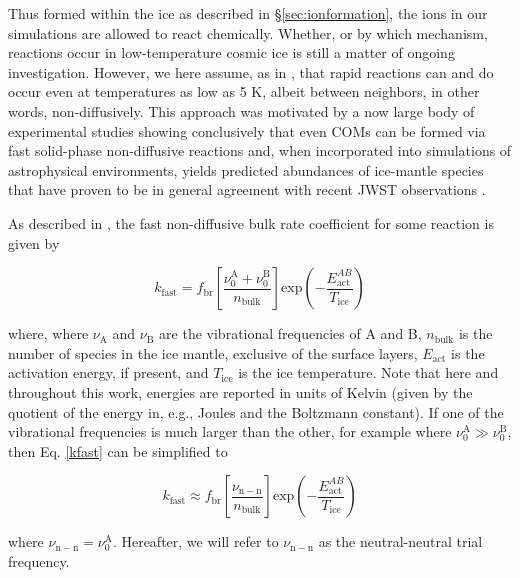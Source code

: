\documentclass[journal=aesccq,manuscript=draft]{achemso}
\begin{document}
Thus formed within the ice as described in \S\ref{sec:ionformation}, the ions in our simulations are allowed to react chemically. Whether, or by which mechanism, reactions occur in low-temperature cosmic ice is still a matter of ongoing investigation. However, we here assume, as in \citet{shingledecker_simulating_2019}, that rapid reactions can and do occur even at temperatures as low as 5 K, albeit between neighbors, in other words, non-diffusively. This approach was motivated by a now large body of experimental studies showing conclusively that even COMs can be formed via fast solid-phase non-diffusive reactions \citep{abplanalp_study_2016,doddipatla_low-temperature_2021,bergantini_combined_2018,fedoseev_hydrogenation_2022} and, when incorporated into simulations of astrophysical environments, yields predicted abundances of ice-mantle species that have proven to be in general agreement with recent JWST observations \citep{shingledecker_efficient_2020,mcclure_ice_2023,yang_corinos_2022}. 

As described in \citet{shingledecker_simulating_2019}, the fast non-diffusive bulk rate coefficient for some reaction  is given by

\begin{equation}
    k_\mathrm{fast} = f_\mathrm{br}\left[\frac{\nu_0^\mathrm{A} + \nu_0^\mathrm{B}}{n_\mathrm{bulk}} \right] \mathrm{exp}\left( - \frac{E_\mathrm{act}^{AB}}{T_\mathrm{ice}}\right)
    \label{kfast}
\end{equation}

\noindent
where, where $\nu_\mathrm{A}$ and $\nu_\mathrm{B}$ are the vibrational frequencies of A and B, $n_\mathrm{bulk}$ is the number of species in the ice mantle, exclusive of the surface layers, $E_\mathrm{act}$ is the activation energy, if present, and $T_\mathrm{ice}$ is the ice temperature. Note that here and throughout this work, energies are reported in units of Kelvin (given by the quotient of the energy in, e.g., Joules and the Boltzmann constant). If one of the vibrational frequencies is much larger than the other, for example where $\nu_0^\mathrm{A} \gg \nu_0^\mathrm{B}$, then Eq. \eqref{kfast} can be simplified to

\begin{equation}
    k_\mathrm{fast} \approx f_\mathrm{br}\left[\frac{\nu_\mathrm{n-n}}{n_\mathrm{bulk}} \right] \mathrm{exp}\left( - \frac{E_\mathrm{act}^{AB}}{T_\mathrm{ice}}\right)
    \label{kfast2}
\end{equation}

\noindent
where $\nu_\mathrm{n-n} = \nu_0^\mathrm{A}$. Hereafter, we will refer to $\nu_\mathrm{n-n}$ as the neutral-neutral trial frequency.
\end{document}

